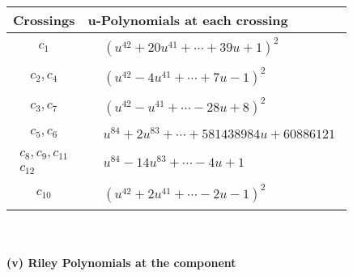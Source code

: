 \documentclass[1p]{elsarticle_modified}
\theoremstyle{definition}
\begin{document}
\begin{tabular}{m{50pt}|m{274pt}}
Crossings & \hspace{64pt}u-Polynomials at each crossing \\
\hline $$\begin{aligned}c_{1}\end{aligned}$$&$\begin{aligned}
&(u^{42}+20 u^{41}+\cdots+39 u+1)^{2}
\end{aligned}$\\
\hline $$\begin{aligned}c_{2},c_{4}\end{aligned}$$&$\begin{aligned}
&(u^{42}-4 u^{41}+\cdots+7 u-1)^{2}
\end{aligned}$\\
\hline $$\begin{aligned}c_{3},c_{7}\end{aligned}$$&$\begin{aligned}
&(u^{42}- u^{41}+\cdots-28 u+8)^{2}
\end{aligned}$\\
\hline $$\begin{aligned}c_{5},c_{6}\end{aligned}$$&$\begin{aligned}
&u^{84}+2 u^{83}+\cdots+581438984 u+60886121
\end{aligned}$\\
\hline $$\begin{aligned}c_{8},c_{9},c_{11}\\c_{12}\end{aligned}$$&$\begin{aligned}
&u^{84}-14 u^{83}+\cdots-4 u+1
\end{aligned}$\\
\hline $$\begin{aligned}c_{10}\end{aligned}$$&$\begin{aligned}
&(u^{42}+2 u^{41}+\cdots-2 u-1)^{2}
\end{aligned}$\\
\hline
\end{tabular}\\~\\
\newpage\renewcommand{\arraystretch}{1}
\flushleft \textbf{(v) Riley Polynomials at the component}\newline \\
\end{document}
